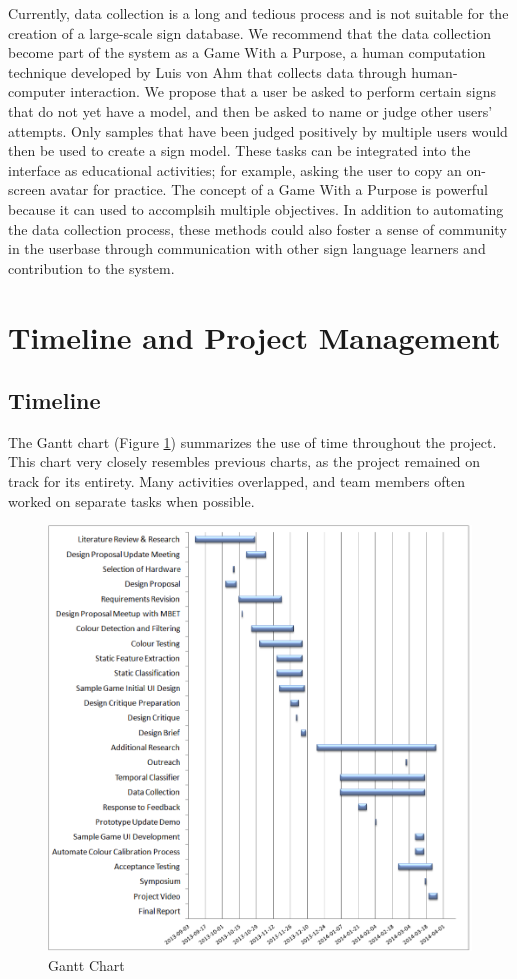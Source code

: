 \documentclass[12pt]{article}
\begin{document}
Currently, data collection is a long and tedious process and is not suitable for the creation of a large-scale sign database. We recommend that the data collection become part of the system as a Game With a Purpose, a human computation technique developed by Luis von Ahm that collects data through human-computer interaction. We propose that a user be asked to perform certain signs that do not yet have a model, and then be asked to name or judge other users’ attempts. Only samples that have been judged positively by multiple users would then be used to create a sign model. These tasks can be integrated into the interface as educational activities; for example, asking the user to copy an on-screen avatar for practice. The concept of a Game With a Purpose is powerful because it can used to accomplsih multiple objectives. In addition to automating the data collection process, these methods could also foster a sense of community in the userbase through communication with other sign language learners and contribution to the system. 


\newpage
\section{Timeline and Project Management}
\subsection{Timeline}
The Gantt chart (Figure \ref{gantt}) summarizes the use of time throughout the project. This chart very closely resembles previous charts, as the project remained on track for its entirety. Many activities overlapped, and team members often worked on separate tasks when possible. 
 
\begin{figure}[h!]
  \centering
  \includegraphics[scale=0.8]{Gantt.png}
  \caption{Gantt Chart}
  \label{gantt}
\end{figure}
\end{document}
